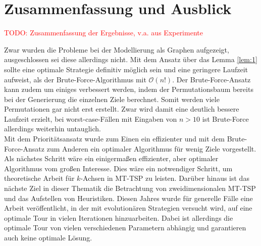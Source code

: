 \documentclass[german,version-2019-11]{uzl-thesis}
\begin{document}
\chapter{Zusammenfassung und Ausblick}
\textcolor{red}{TODO: Zusammenfassung der Ergebnisse, v.a. aus Experimente} 

\noindent
Zwar wurden die Probleme bei der Modellierung als Graphen aufgezeigt, ausgeschlossen sei diese allerdings nicht. Mit dem Ansatz über das Lemma \ref{lem:1} sollte eine optimale Strategie definitiv möglich sein und eine geringere Laufzeit aufweist, als der Brute-Force-Algorithmus mit $\mathcal{O}(n!)$. Der Brute-Force-Ansatz kann zudem um einiges verbessert werden, indem der Permutationsbaum bereits bei der Generierung die einzelnen Ziele berechnet. Somit werden viele Permutationen gar nicht erst erstellt. Zwar wird damit eine deutlich bessere Laufzeit erzielt, bei worst-case-Fällen mit Eingaben von $n>10$ ist Brute-Force allerdings weiterhin untauglich.\\
Mit dem Prioritätsansatz wurde zum Einen ein effizienter und mit dem Brute-Force-Ansatz zum Anderen ein optimaler Algorithmus für wenig Ziele vorgestellt. Als nächstes Schritt wäre ein einigermaßen effizienter, aber optimaler Algorithmus vom großen Interesse. Dies wäre ein notwendiger Schritt, um theoretische Arbeit für $k$-Achsen in MT-TSP zu leisten. Darüber hinaus ist das nächste Ziel in dieser Thematik die Betrachtung von zweidimensionalen MT-TSP und das Aufstellen von Heuristiken.
Diesen Jahres wurde für generelle Fälle eine Arbeit\cite{moraes} veröffentlicht, in der mit evolutionären Strategien versucht wird, auf eine optimale Tour in vielen Iterationen hinzuarbeiten. Dabei ist allerdings die optimale Tour von vielen verschiedenen Parametern abhängig und garantieren auch keine optimale Lösung. 
\end{document}
